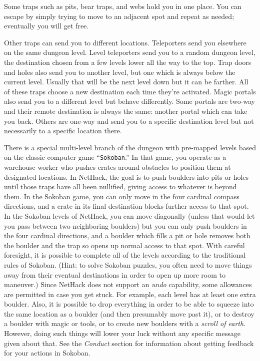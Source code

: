 Some traps such as pits, bear traps, and webs hold you in one place.
You can escape by simply trying to move to an adjacent spot and repeat
as needed; eventually you will get free.

Other traps can send you to different locations.
Teleporters send you elsewhere on the same dungeon level.
Level teleporters send you to a random dungeon level, the destination
chosen from a few levels lower all the way to the top.
Trap doors and holes also send you to another level, but one which is
always below the current level.
Usually that will be the next level down but it can be farther.
All of these traps choose a new destination each time they're activated.
Magic portals also send you to a different level but behave differently.
Some portals are two-way and their remote destination is always the same:
another portal which can take you back.
Others are one-way and send you to a specific destination level but not
necessarily to a specific location there.

There is a special multi-level branch of the dungeon with pre-mapped levels
based on the classic computer game ``{\tt Sokoban}.''
In that game, you operate as a warehouse worker who pushes crates around
obstacles to position them at designated locations.
In NetHack, the goal is to push boulders into pits or holes until those
traps have all been nullified, giving access to whatever is beyond them.
In the Sokoban game, you can only move in the four cardinal compass
directions, and a crate in its final destination blocks further access
to that spot.
In the Sokoban levels of NetHack, you can move diagonally (unless that
would let you pass between two neighboring boulders) but you can only
push boulders in the four cardinal directions, and a boulder which fills
a pit or hole removes both the boulder and the trap so opens up normal
access to that spot.
With careful foresight, it is possible to complete all of the levels
according to the traditional rules of Sokoban.
(Hint: to solve Sokoban puzzles, you often need to move things away from
their eventual destinations in order to open up more room to maneuver.)
Since NetHack does not support an {\it undo\/} capability, some allowances
are permitted in case you get stuck.
For example, each level has at least one extra boulder.
Also, it is possible to drop everything in order to be able to squeeze
into the same location as a boulder (and then presumably move past it),
or to destroy a boulder with magic or tools, or to create new boulders
with a {\it scroll of earth}.
However, doing such things will lower your luck without any specific
message given about that.
See the {\it Conduct\/} section for information about getting feedback for
your actions in Sokoban.

